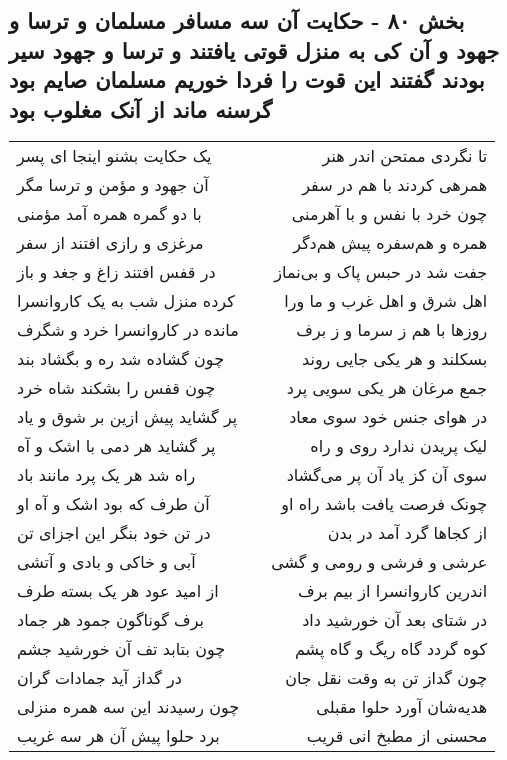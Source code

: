 \begin{center}
\section*{بخش ۸۰ - حکایت آن سه مسافر مسلمان و ترسا و جهود و آن کی به منزل قوتی یافتند و ترسا و جهود سیر بودند گفتند این قوت را فردا خوریم مسلمان صایم بود گرسنه ماند از آنک مغلوب بود}
\label{sec:sh080}
\begin{longtable}{l p{0.5cm} r}
یک حکایت بشنو اینجا ای پسر
&&
تا نگردی ممتحن اندر هنر
\\
آن جهود و مؤمن و ترسا مگر
&&
همرهی کردند با هم در سفر
\\
با دو گمره همره آمد مؤمنی
&&
چون خرد با نفس و با آهرمنی
\\
مرغزی و رازی افتند از سفر
&&
همره و هم‌سفره پیش هم‌دگر
\\
در قفس افتند زاغ و جغد و باز
&&
جفت شد در حبس پاک و بی‌نماز
\\
کرده منزل شب به یک کاروانسرا
&&
اهل شرق و اهل غرب و ما ورا
\\
مانده در کاروانسرا خرد و شگرف
&&
روزها با هم ز سرما و ز برف
\\
چون گشاده شد ره و بگشاد بند
&&
بسکلند و هر یکی جایی روند
\\
چون قفس را بشکند شاه خرد
&&
جمع مرغان هر یکی سویی پرد
\\
پر گشاید پیش ازین بر شوق و یاد
&&
در هوای جنس خود سوی معاد
\\
پر گشاید هر دمی با اشک و آه
&&
لیک پریدن ندارد روی و راه
\\
راه شد هر یک پرد مانند باد
&&
سوی آن کز یاد آن پر می‌گشاد
\\
آن طرف که بود اشک و آه او
&&
چونک فرصت یافت باشد راه او
\\
در تن خود بنگر این اجزای تن
&&
از کجاها گرد آمد در بدن
\\
آبی و خاکی و بادی و آتشی
&&
عرشی و فرشی و رومی و گشی
\\
از امید عود هر یک بسته طرف
&&
اندرین کاروانسرا از بیم برف
\\
برف گوناگون جمود هر جماد
&&
در شتای بعد آن خورشید داد
\\
چون بتابد تف آن خورشید جشم
&&
کوه گردد گاه ریگ و گاه پشم
\\
در گداز آید جمادات گران
&&
چون گداز تن به وقت نقل جان
\\
چون رسیدند این سه همره منزلی
&&
هدیه‌شان آورد حلوا مقبلی
\\
برد حلوا پیش آن هر سه غریب
&&
محسنی از مطبخ انی قریب
\\

\end{longtable}
\end{center}
